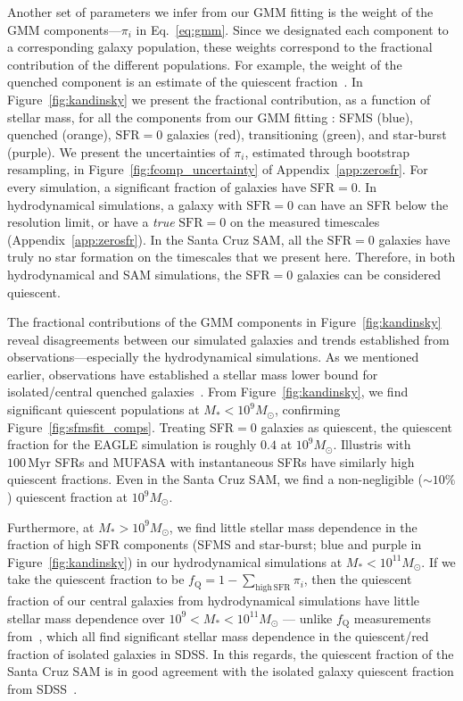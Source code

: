 \documentclass[preprint2,tighten]{aastex62}
\begin{document}
Another set of parameters we infer from our GMM fitting is the weight of the 
GMM components---$\pi_i$ in Eq.~\ref{eq:gmm}. Since we designated each component 
to a corresponding galaxy population, these weights correspond to the fractional
contribution of the different populations. For example, the weight of the 
quenched component is an estimate of the quiescent 
fraction~\citep[\emph{e.g.}][]{blanton2009, geha2012, hahn2015}. In 
Figure~\ref{fig:kandinsky} we present the fractional contribution, as a function 
of stellar mass, for all the components from our GMM fitting : SFMS (blue), 
quenched (orange), $\mathrm{SFR}=0$ galaxies (red), transitioning (green), 
and star-burst (purple). We present the uncertainties of $\pi_i$, estimated
through bootstrap resampling, in Figure~\ref{fig:fcomp_uncertainty} of 
Appendix~\ref{app:zerosfr}. 
For every simulation, a significant fraction of galaxies have SFR$=0$. 
In hydrodynamical simulations, a galaxy with $\mathrm{SFR}{=}0$ can have an 
SFR below the resolution limit, or have a \emph{true} $\mathrm{SFR}{=}0$ on 
the measured timescales (Appendix~\ref{app:zerosfr}). In the Santa 
Cruz SAM, all the $\mathrm{SFR}{=}0$ galaxies have truly no star formation 
on the timescales that we present here. Therefore, in both hydrodynamical 
and SAM simulations, the SFR$=0$ galaxies can be considered quiescent. 

The fractional contributions of the GMM components in Figure~\ref{fig:kandinsky}
reveal disagreements between our simulated galaxies and trends established
from observations---especially the hydrodynamical simulations. As we 
mentioned earlier, observations have established a stellar mass lower bound 
for isolated/central quenched galaxies~\citep{geha2012}. From Figure~\ref{fig:kandinsky}, 
we find significant quiescent populations at $M_* < 10^9 M_\odot$, confirming 
Figure~\ref{fig:sfmsfit_comps}. Treating SFR$=0$ galaxies as quiescent, the quiescent 
fraction for the EAGLE simulation is roughly $0.4$ at $10^9M_\odot$. 
Illustris with $100\,\mathrm{Myr}$ SFRs and MUFASA with instantaneous SFRs
have similarly high quiescent fractions. Even in the Santa Cruz SAM, we 
find a non-negligible ($\sim 10\%$) quiescent fraction at $10^9M_\odot$. 

Furthermore, at $M_* > 10^9M_\odot$, we find little stellar mass dependence in the 
fraction of high SFR components (SFMS and star-burst; blue and purple 
in Figure~\ref{fig:kandinsky}) in our hydrodynamical simulations at 
$M_* < 10^{11}M_\odot$. If we take the quiescent fraction to be 
$f_\mathrm{Q} = 1 - \sum_{\mathrm{high\,SFR}} \pi_i$, then the 
quiescent fraction of our central galaxies from hydrodynamical simulations 
have little stellar mass dependence over $10^9 < M_* < 10^{11} M_\odot$ ---
unlike $f_\mathrm{Q}$ measurements from~\cite{baldry2006,peng2010,hahn2015},
which all find significant stellar mass dependence in the quiescent/red fraction of 
isolated galaxies in SDSS. In this regards, the quiescent fraction of the 
Santa Cruz SAM is in good agreement with the isolated galaxy 
quiescent fraction from SDSS~\citep{baldry2006,peng2010,hahn2015}.
\end{document}
